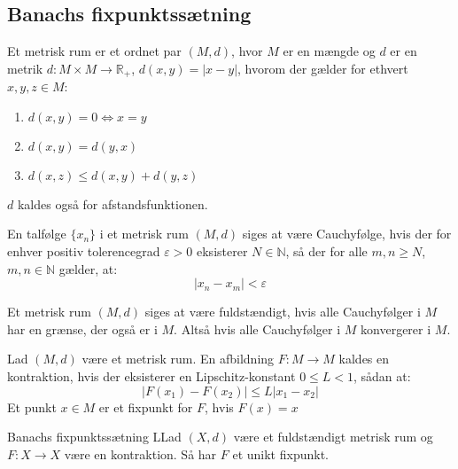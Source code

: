 \subsection{Banachs fixpunktssætning}

\begin{definition}
Et metrisk rum er et ordnet par $(M,d)$, hvor $M$ er en mængde og $d$ er en metrik $d:M\times M \rightarrow \mathbb{R}_+$, $d(x,y)=|x-y|$, hvorom der gælder for ethvert $x,y,z \in M$: 
\begin{enumerate}
    \item $d(x,y)=0 \Leftrightarrow x=y$ 
    \item $d(x,y)=d(y,x)$
    \item $d(x,z)\leq d(x,y)+d(y,z)$
\end{enumerate}
$d$ kaldes også for afstandsfunktionen.
\end{definition}

\begin{definition}
En talfølge $\{x_n\}$ i et metrisk rum $(M,d)$ siges at være Cauchyfølge, hvis der for enhver positiv tolerencegrad $\varepsilon >0$ eksisterer $N \in \mathbb{N}$, så der for alle $m,n \geq N$, $m,n \in \mathbb{N}$ gælder, at: 
$$|x_n-x_m|<\varepsilon$$
\end{definition}

\begin{definition}
Et metrisk rum $(M,d)$ siges at være fuldstændigt, hvis alle Cauchyfølger i $M$ har en grænse, der også er i $M$. Altså hvis alle Cauchyfølger i $M$ konvergerer i $M$.
\end{definition}

\begin{definition}
Lad $(M,d)$ være et metrisk rum. En afbildning $F:M\rightarrow M$ kaldes en kontraktion, hvis der eksisterer en Lipschitz-konstant $0 \leq L < 1$, sådan at:
$$|F(x_1)-F(x_2)|\leq L|x_1-x_2|$$
Et punkt $x \in M$ er et fixpunkt for $F$, hvis $F(x)=x$ 
\end{definition}

\begin{mytheo}{Banachs fixpunktssætning}
LLad $(X,d)$ være et fuldstændigt metrisk rum og $F:X\rightarrow X$ være en kontraktion. Så har $F$ et unikt fixpunkt.
\end{mytheo}

